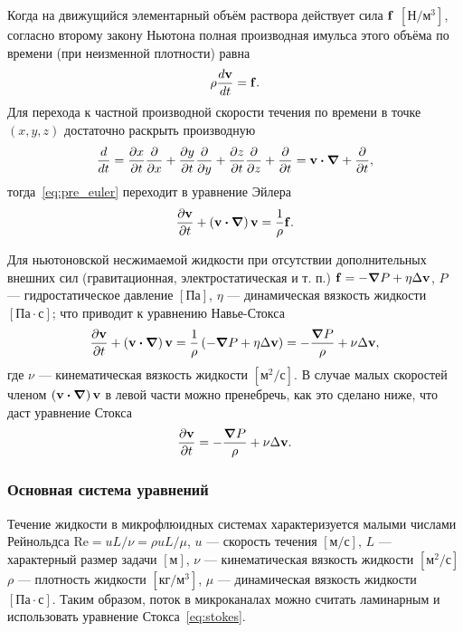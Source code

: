 \documentclass[oneside,final,12pt]{extreport}
\newcommand\bcdot[0]{\boldsymbol\cdot}
\newcommand\bnabla[0]{\boldsymbol\nabla}
\begin{document}
Когда на движущийся элементарный объём раствора действует сила
$\vb f$ $\left[\text{Н}/\text{м}^3\right]$,
согласно второму закону Ньютона полная производная имульса этого объёма по времени
(при неизменной плотности) равна
\begin{equation}
  \rho\frac{d \vb v}{d t} = \vb f.
\label{eq:pre_euler}
\end{equation}
Для перехода к частной производной скорости течения по времени в точке
$\left(x, y, z\right)$ достаточно раскрыть производную
\begin{equation}
  \frac{d}{dt} = \frac{\partial x}{\partial t}\frac{\partial}{\partial x} +
                 \frac{\partial y}{\partial t}\frac{\partial}{\partial y} +
                 \frac{\partial z}{\partial t}\frac{\partial}{\partial z} +
                 \frac{\partial}{\partial t}
               = \vb v \bcdot \bnabla + \frac{\partial}{\partial t},
\end{equation}
тогда~\eqref{eq:pre_euler} переходит в уравнение Эйлера
\begin{equation}
  \frac{\partial \vb v}{\partial t} + \left(\vb v \bcdot \bnabla\right) \vb v = \frac{1}{\rho} \vb f.
\label{eq:euler}
\end{equation}

Для ньютоновской несжимаемой жидкости при отсутствии дополнительных внешних сил
(гравитационная, электростатическая и т. п.)
$\vb f = - \grad P + \eta \Delta \vb v$,
$P$ --- гидростатическое давление $\left[\text{Па}\right]$,
$\eta$ --- динамическая вязкость жидкости $\left[\text{Па}\cdot\text{с}\right]$;
что приводит к уравнению Навье-Стокса\cite{bib:ll}
\begin{equation}
  \frac{\partial \vb v}{\partial t} + \left(\vb v \bcdot \bnabla\right) \vb v =
    \frac{1}{\rho}\left(-\grad P + \eta \Delta \vb v\right) =
    -\frac{\grad P}{\rho} + \nu \Delta \vb v,
\label{eq:navier-stokes}
\end{equation}
где $\nu$ --- кинематическая вязкость жидкости $\left[\text{м}^2/\text{с}\right]$.
В случае малых скоростей членом $\left(\vb v \bcdot \bnabla\right) \vb v$
в левой части можно пренебречь, как это сделано ниже, что даст уравнение Стокса
\begin{equation}
  \frac{\partial \vb v}{\partial t} = -\frac{\grad P}{\rho} + \nu \Delta \vb v.
\label{eq:stokes}
\end{equation}

\subsubsection*{Основная система уравнений}
Течение жидкости в микрофлюидных системах характеризуется малыми числами
Рейнольдса $\text{Re} = u L / \nu = \rho u L / \mu$,
$u$ --- скорость течения $\left[\text{м}/\text{с}\right]$,
$L$ --- характерный размер задачи $\left[\text{м}\right]$,
$\nu$ --- кинематическая вязкость жидкости $\left[\text{м}^2/\text{с}\right]$
$\rho$ --- плотность жидкости $\left[\text{кг}/\text{м}^3\right]$,
$\mu$ --- динамическая вязкость жидкости $\left[\text{Па}\cdot\text{с}\right]$.
Таким образом, поток в микроканалах можно считать ламинарным и использовать
уравнение Стокса~\eqref{eq:stokes}.
\end{document}

